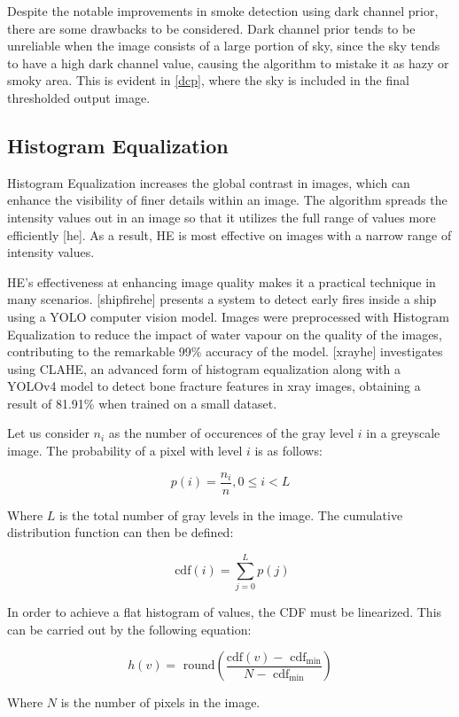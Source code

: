 Despite the notable improvements in smoke detection using dark channel
prior, there are some drawbacks to be considered. Dark channel prior
tends to be unreliable when the image consists of a large portion of
sky, since the sky tends to have a high dark channel value, causing the
algorithm to mistake it as hazy or smoky area. This is evident in
\hyperref[dcp]{{[}dcp{]}}, where the sky is included in the final
thresholded output image.

\subsection{Histogram Equalization}

Histogram Equalization increases the global contrast in images, which
can enhance the visibility of finer details within an image. The
algorithm spreads the intensity values out in an image so that it
utilizes the full range of values more efficiently {[}he{]}. As a
result, HE is most effective on images with a narrow range of intensity
values.

HE's effectiveness at enhancing image quality makes it a practical
technique in many scenarios. {[}shipfirehe{]} presents a system to
detect early fires inside a ship using a YOLO computer vision model.
Images were preprocessed with Histogram Equalization to reduce the
impact of water vapour on the quality of the images, contributing to the
remarkable 99\% accuracy of the model. {[}xrayhe{]} investigates using
CLAHE, an advanced form of histogram equalization along with a YOLOv4
model to detect bone fracture features in xray images, obtaining a
result of 81.91\% when trained on a small dataset.

Let us consider \(n_{i}\) as the number of occurences of the gray level
\(i\) in a greyscale image. The probability of a pixel with level \(i\)
is as follows:

\[p(i) = \frac{n_{i}}{n},0 \leq i < L\]

Where \(L\) is the total number of gray levels in the image. The
cumulative distribution function can then be defined:

\[\text{ cdf}(i) = \sum_{j = 0}^{L}p(j)\]

In order to achieve a flat histogram of values, the CDF must be
linearized. This can be carried out by the following equation:

\[h(v) = \text{ round}\left( \frac{\text{cdf}(v) - \text{ cdf}_{\text{min}}}{N - \text{ cdf}_{\min}} \right)\]

Where \(N\) is the number of pixels in the image.

